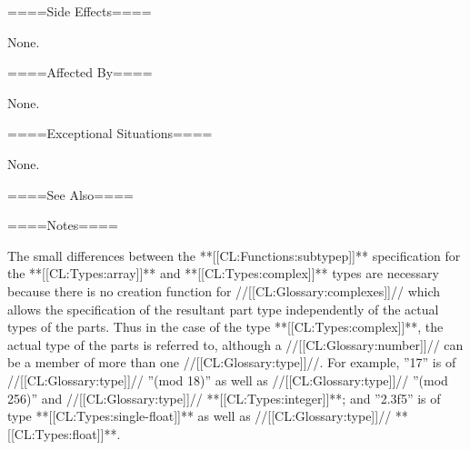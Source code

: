 ====Side Effects====

None.

====Affected By====

None.

====Exceptional Situations====

None.

====See Also====

{\secref\Types}

====Notes====

The small differences between the **[[CL:Functions:subtypep]]** specification for the **[[CL:Types:array]]** and **[[CL:Types:complex]]** types are necessary because there is no creation function for //[[CL:Glossary:complexes]]// which allows the specification of the resultant part type independently of the actual types of the parts. Thus in the case of the type **[[CL:Types:complex]]**, the actual type of the parts is referred to, although a //[[CL:Glossary:number]]// can be a member of more than one //[[CL:Glossary:type]]//. For example, ''17'' is of //[[CL:Glossary:type]]// ''(mod 18)'' as well as //[[CL:Glossary:type]]// ''(mod 256)'' and //[[CL:Glossary:type]]// **[[CL:Types:integer]]**; and ''2.3f5'' is of type **[[CL:Types:single-float]]** as well as //[[CL:Glossary:type]]// **[[CL:Types:float]]**.



    
